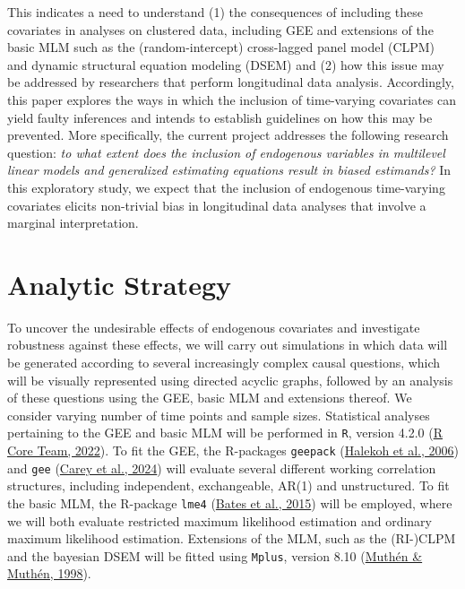 \documentclass[
  12pt,
  a4paper,
]{article}
\begin{document}
This indicates a need to understand (1) the consequences of including
these covariates in analyses on clustered data, including GEE and
extensions of the basic MLM such as the (random-intercept) cross-lagged
panel model (CLPM) and dynamic structural equation modeling (DSEM) and
(2) how this issue may be addressed by researchers that perform
longitudinal data analysis. Accordingly, this paper explores the ways in
which the inclusion of time-varying covariates can yield faulty
inferences and intends to establish guidelines on how this may be
prevented. More specifically, the current project addresses the
following research question: \emph{to what extent does the inclusion of
endogenous variables in multilevel linear models and generalized
estimating equations result in biased estimands?} In this exploratory
study, we expect that the inclusion of endogenous time-varying
covariates elicits non-trivial bias in longitudinal data analyses that
involve a marginal interpretation.

\hypertarget{analytic-strategy}{%
\section{Analytic Strategy}\label{analytic-strategy}}

To uncover the undesirable effects of endogenous covariates and
investigate robustness against these effects, we will carry out
simulations in which data will be generated according to several
increasingly complex causal questions, which will be visually
represented using directed acyclic graphs, followed by an analysis of
these questions using the GEE, basic MLM and extensions thereof. We
consider varying number of time points and sample sizes. Statistical
analyses pertaining to the GEE and basic MLM will be performed in
\texttt{R}, version 4.2.0 (\protect\hyperlink{ref-rcoreteam2022}{R Core
Team, 2022}). To fit the GEE, the R-packages \texttt{geepack}
(\protect\hyperlink{ref-halekoh2006}{Halekoh et al., 2006}) and
\texttt{gee} (\protect\hyperlink{ref-carey2024}{Carey et al., 2024})
will evaluate several different working correlation structures,
including independent, exchangeable, AR(1) and unstructured. To fit the
basic MLM, the R-package \texttt{lme4}
(\protect\hyperlink{ref-bates2015}{Bates et al., 2015}) will be
employed, where we will both evaluate restricted maximum likelihood
estimation and ordinary maximum likelihood estimation. Extensions of the
MLM, such as the (RI-)CLPM and the bayesian DSEM will be fitted using
\texttt{Mplus}, version 8.10
(\protect\hyperlink{ref-muthuxe9n1998}{Muthén \& Muthén, 1998}).
\end{document}
